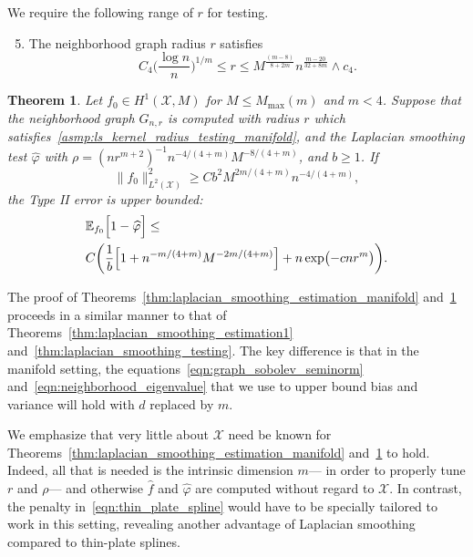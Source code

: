 \documentclass[twoside]{article}
\newcommand{\1}{\mathbf{1}}
\newcommand{\Xset}{\mathcal{X}}
\newcommand{\Leb}{L}
\newcommand{\Ebb}{\mathbb{E}}
\newcommand{\wh}[1]{\widehat{#1}}
\newtheorem{theorem}{Theorem}
\theoremstyle{definition}
\theoremstyle{remark}
\begin{document}
We require the following range of $r$ for testing.
\begin{enumerate}[label=(R\arabic*)]
	\setcounter{enumi}{4}
	\item 
	\label{asmp:ls_kernel_radius_testing_manifold}
	The neighborhood graph radius $r$ satisfies
	\begin{equation*}
	C_4\biggl(\frac{\log n}{n}\biggr)^{1/m} \leq r \leq M^{\frac{(m - 8)}{8 + 2m}}n^{\frac{m - 20}{32 + 8m}} \wedge c_4.
	\end{equation*}
\end{enumerate}

\begin{theorem}
	\label{thm:laplacian_smoothing_testing_manifold}
	Let $f_0 \in H^1(\Xset,M)$ for $M \leq M_{\max}(m)$ and $m < 4$. Suppose that the neighborhood graph $G_{n,r}$ is computed with radius $r$ which satisfies~\ref{asmp:ls_kernel_radius_testing_manifold}, and the Laplacian smoothing test $\wh{\varphi}$ with $\rho = (nr^{m + 2})^{-1} n^{-4/(4 + m)} M^{-8/(4 + m)}$, and $b \geq 1$. If
	\begin{equation}
	\label{eqn:laplacian_smoothing_testing_manifold}
	\bigl\|f_0\bigr\|_{\Leb^2(\Xset)}^2 \geq C b^2 M^{2m/(4 + m)} n^{-4/(4 + m)},
	\end{equation} 
	the Type II error is upper bounded:
	\begin{align*}
	& \Ebb_{f_0}\Bigl[1 - \wh{\varphi} \Bigr] \leq \\
	& C\biggl(\frac{1}{b}\Bigl[1 + n^{-m/(4 + m)}M^{-2m/(4 + m)}\Bigr] + n\exp\bigl(-cnr^m\bigr)\biggr).
	\end{align*}
\end{theorem}
The proof of Theorems~\ref{thm:laplacian_smoothing_estimation_manifold} and~\ref{thm:laplacian_smoothing_testing_manifold} proceeds in a similar manner to that of Theorems~\ref{thm:laplacian_smoothing_estimation1} and~\ref{thm:laplacian_smoothing_testing}. The key difference is that in the manifold setting, the equations~\eqref{eqn:graph_sobolev_seminorm} and~\eqref{eqn:neighborhood_eigenvalue} that we use to upper bound bias and variance will hold with $d$ replaced by $m$.

We emphasize that very little about $\Xset$ need be known for Theorems~\ref{thm:laplacian_smoothing_estimation_manifold} and~\ref{thm:laplacian_smoothing_testing_manifold} to hold. Indeed, all that is needed is the intrinsic dimension $m$--- in order to properly tune $r$ and $\rho$--- and otherwise $\wh{f}$ and $\wh{\varphi}$ are computed without regard to $\Xset$. In contrast, the penalty in~\eqref{eqn:thin_plate_spline} would have to be specially tailored to work in this setting, revealing another advantage of Laplacian smoothing compared to thin-plate splines.
\end{document}

